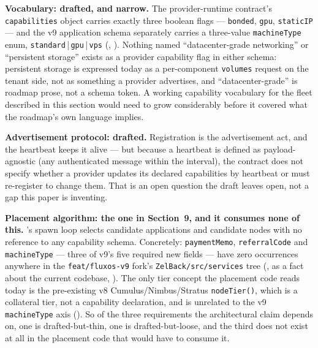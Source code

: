 \textbf{Vocabulary: drafted, and narrow.} The provider-runtime contract's \texttt{capabilities} object
carries exactly three boolean flags — \texttt{bonded}, \texttt{gpu}, \texttt{staticIP} — and the v9
application schema separately carries a three-value \texttt{machineType} enum,
\texttt{standard}\,|\,\texttt{gpu}\,|\,\texttt{vps} (\inprogress,
). Nothing named ``datacenter-grade networking'' or
``persistent storage'' exists as a provider capability flag in either schema: persistent storage is
expressed today as a per-component \texttt{volumes} request on the tenant side, not as something a
provider advertises, and ``datacenter-grade'' is roadmap prose, not a schema token. A working
capability vocabulary for the fleet described in this section would need to grow considerably before
it covered what the roadmap's own language implies.

\textbf{Advertisement protocol: drafted.} Registration is the advertisement act, and the heartbeat
keeps it alive — but because a heartbeat is defined as payload-agnostic (any authenticated message
within the interval), the contract does not specify whether a provider updates its declared
capabilities by heartbeat or must re-register to change them. That is an open question the draft
leaves open, not a gap this paper is inventing.

\textbf{Placement algorithm: the one in Section~9, and it consumes none of this.} \FluxOS's spawn
loop selects candidate applications and candidate nodes with no reference to any capability schema.
Concretely: \texttt{paymentMemo}, \texttt{referralCode} and \texttt{machineType} — three of v9's five
required new fields — have zero occurrences anywhere in the \texttt{feat/fluxos-v9} fork's
\texttt{ZelBack/\allowbreak{}src/\allowbreak{}services} tree (\inprogress, as a fact about the current codebase,
). The only tier concept the placement code reads today is the pre-existing v8
Cumulus/Nimbus/Stratus \texttt{nodeTier()}, which is a collateral tier, not a capability declaration,
and is unrelated to the v9 \texttt{machineType} axis
(). So of the three
requirements the architectural claim depends on, one is drafted-but-thin, one is drafted-but-loose,
and the third does not exist at all in the placement code that would have to consume it.

